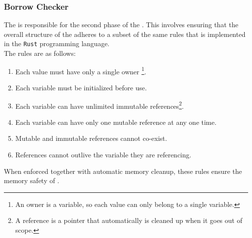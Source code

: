 \subsubsection{Borrow Checker}

The \borrowChecker{} is responsible for the second phase of the \static. This
involves ensuring that the overall structure of the \ast{} adheres to a subset of the
same rules that is implemented in the \texttt{Rust} programming language\cite{RUST}.
\\

The rules are as follows:

\begin{enumerate} 
  \item Each value must have only a single owner \footnote{An owner is a variable, so
    each value can only belong to a single variable.}. 
  
  \item Each variable must be initialized before use. 

  \item Each variable can have unlimited immutable references\footnote{A reference is
    a pointer that automatically is cleaned up when it goes out of scope.}.

  \item Each variable can have only one mutable reference at any one time. 

  \item Mutable and immutable references cannot co-exist. 

  \item References cannot outlive the variable they are referencing.
\end{enumerate}

When enforced together with automatic memory cleanup, these rules ensure the memory
safety of \lang. 
